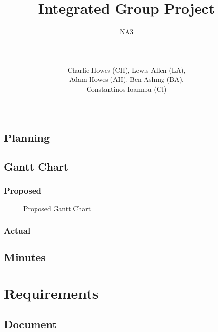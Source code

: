 \documentclass[a4paper]{article}
\title{Integrated Group Project}
\author{NA3
	\\ \rule{5cm}{0.4pt}
	\\Charlie Howes (CH), Lewis Allen (LA), 
    \\Adam Howes (AH), Ben Ashing (BA), 
    \\Constantinos Ioannou (CI)
    \\ \rule{5cm}{0.4pt}
} %
\begin{document}
\maketitle

\tableofcontents

\pagebreak

\begin{landscape} %
\section{Planning}
\subsection{Gantt Chart}
\subsubsection{Proposed}
\begin{figure}[!ht] %
    \centering
    \caption{Proposed Gantt Chart}
    \label{fig:proposed_gantt}
\end{figure}
\end{landscape}

\subsubsection{Actual} %

\subsection{Minutes}

\section{Requirements}

\subsection{Document} %
\end{document}
